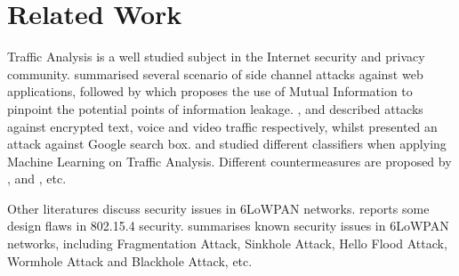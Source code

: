 \section{Related Work \label{RelatedWork}}
Traffic Analysis is a well studied subject in the Internet security and privacy community. \cite{WebSidechannel} summarised several scenario of side channel attacks against web applications, followed by \cite{PinpointWeb} which proposes the use of Mutual Information to pinpoint the potential points of information leakage. \cite{AppleMsg}, \cite{Language} and \cite{VideoTraffic} described attacks against encrypted text, voice and video traffic respectively, whilst \cite{SuggestBox} presented an attack against Google search box. \cite{HClassifier} and \cite{Peekaboo} studied different classifiers when applying Machine Learning on Traffic Analysis. Different countermeasures are proposed by \cite{TrafficMorphing}, \cite{HTTPOS} and \cite{FTE}, etc.

Other literatures discuss security issues in 6LoWPAN networks. \cite{802154SecIssues} reports some design flaws in 802.15.4 security. \cite{6LoWPANAtk} summarises known security issues in 6LoWPAN networks, including Fragmentation Attack\cite{FragAtk}, Sinkhole Attack\cite{Sinkhole}, Hello Flood Attack\cite{HelloFlood}, Wormhole Attack\cite{Wormhole} and Blackhole Attack\cite{Blackhole}, etc.